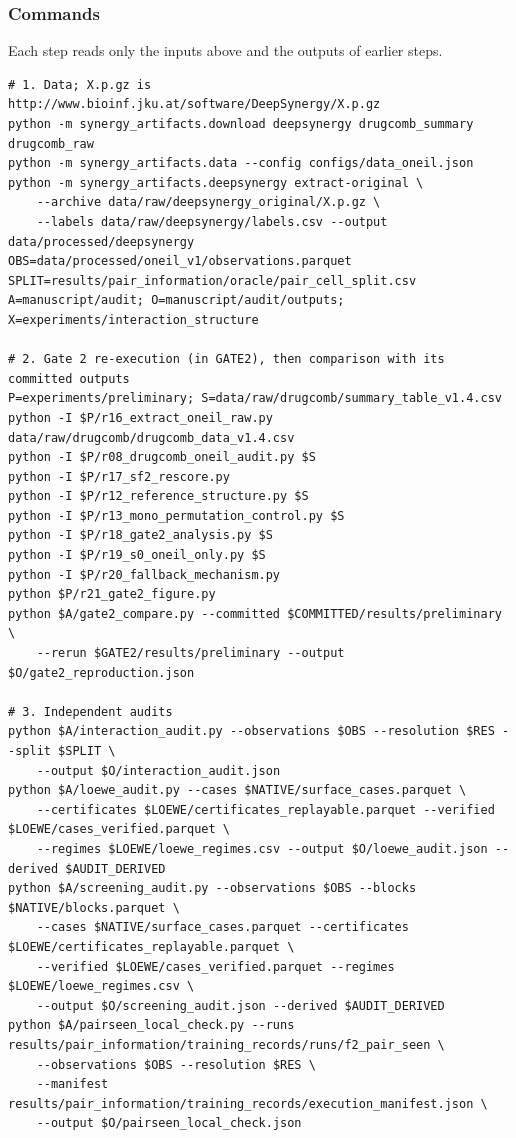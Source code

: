 \documentclass[11pt]{article}
\begin{document}
\subsubsection*{Commands} Each step reads only the inputs above and the outputs of earlier steps.
{\footnotesize
\begin{verbatim}
# 1. Data; X.p.gz is http://www.bioinf.jku.at/software/DeepSynergy/X.p.gz
python -m synergy_artifacts.download deepsynergy drugcomb_summary drugcomb_raw
python -m synergy_artifacts.data --config configs/data_oneil.json
python -m synergy_artifacts.deepsynergy extract-original \
    --archive data/raw/deepsynergy_original/X.p.gz \
    --labels data/raw/deepsynergy/labels.csv --output data/processed/deepsynergy
OBS=data/processed/oneil_v1/observations.parquet
SPLIT=results/pair_information/oracle/pair_cell_split.csv
A=manuscript/audit; O=manuscript/audit/outputs; X=experiments/interaction_structure

# 2. Gate 2 re-execution (in GATE2), then comparison with its committed outputs
P=experiments/preliminary; S=data/raw/drugcomb/summary_table_v1.4.csv
python -I $P/r16_extract_oneil_raw.py data/raw/drugcomb/drugcomb_data_v1.4.csv
python -I $P/r08_drugcomb_oneil_audit.py $S
python -I $P/r17_sf2_rescore.py
python -I $P/r12_reference_structure.py $S
python -I $P/r13_mono_permutation_control.py $S
python -I $P/r18_gate2_analysis.py $S
python -I $P/r19_s0_oneil_only.py $S
python -I $P/r20_fallback_mechanism.py
python $P/r21_gate2_figure.py
python $A/gate2_compare.py --committed $COMMITTED/results/preliminary \
    --rerun $GATE2/results/preliminary --output $O/gate2_reproduction.json

# 3. Independent audits
python $A/interaction_audit.py --observations $OBS --resolution $RES --split $SPLIT \
    --output $O/interaction_audit.json
python $A/loewe_audit.py --cases $NATIVE/surface_cases.parquet \
    --certificates $LOEWE/certificates_replayable.parquet --verified $LOEWE/cases_verified.parquet \
    --regimes $LOEWE/loewe_regimes.csv --output $O/loewe_audit.json --derived $AUDIT_DERIVED
python $A/screening_audit.py --observations $OBS --blocks $NATIVE/blocks.parquet \
    --cases $NATIVE/surface_cases.parquet --certificates $LOEWE/certificates_replayable.parquet \
    --verified $LOEWE/cases_verified.parquet --regimes $LOEWE/loewe_regimes.csv \
    --output $O/screening_audit.json --derived $AUDIT_DERIVED
python $A/pairseen_local_check.py --runs results/pair_information/training_records/runs/f2_pair_seen \
    --observations $OBS --resolution $RES \
    --manifest results/pair_information/training_records/execution_manifest.json \
    --output $O/pairseen_local_check.json


\end{verbatim}}
\end{document}
